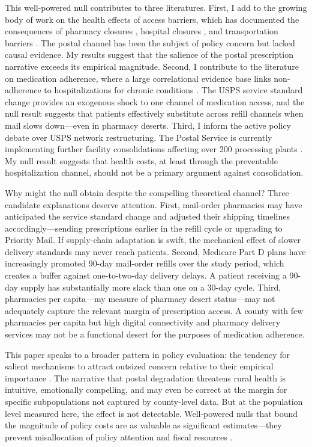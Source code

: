 \documentclass[12pt]{article}
\begin{document}
This well-powered null contributes to three literatures. First, I add to the growing body of work on the health effects of access barriers, which has documented the consequences of pharmacy closures \citep{guadamuz2021pharmacy, evens2023pharmacy}, hospital closures \citep{buchmueller2006flight, gujral2020impact}, and transportation barriers \citep{syed2013traveling}. The postal channel has been the subject of policy concern \citep{brookings2021mail} but lacked causal evidence. My results suggest that the salience of the postal prescription narrative exceeds its empirical magnitude. Second, I contribute to the literature on medication adherence, where a large correlational evidence base links non-adherence to hospitalizations for chronic conditions \citep{ho2009importance, sokol2005adherence}. The USPS service standard change provides an exogenous shock to one channel of medication access, and the null result suggests that patients effectively substitute across refill channels when mail slows down---even in pharmacy deserts. Third, I inform the active policy debate over USPS network restructuring. The Postal Service is currently implementing further facility consolidations affecting over 200 processing plants \citep{usps2023network}. My null result suggests that health costs, at least through the preventable hospitalization channel, should not be a primary argument against consolidation.

Why might the null obtain despite the compelling theoretical channel? Three candidate explanations deserve attention. First, mail-order pharmacies may have anticipated the service standard change and adjusted their shipping timelines accordingly---sending prescriptions earlier in the refill cycle or upgrading to Priority Mail. If supply-chain adaptation is swift, the mechanical effect of slower delivery standards may never reach patients. Second, Medicare Part D plans have increasingly promoted 90-day mail-order refills over the study period, which creates a buffer against one-to-two-day delivery delays. A patient receiving a 90-day supply has substantially more slack than one on a 30-day cycle. Third, pharmacies per capita---my measure of pharmacy desert status---may not adequately capture the relevant margin of prescription access. A county with few pharmacies per capita but high digital connectivity and pharmacy delivery services may not be a functional desert for the purposes of medication adherence.

This paper speaks to a broader pattern in policy evaluation: the tendency for salient mechanisms to attract outsized concern relative to their empirical importance \citep{chandra2011technology}. The narrative that postal degradation threatens rural health is intuitive, emotionally compelling, and may even be correct at the margin for specific subpopulations not captured by county-level data. But at the population level measured here, the effect is not detectable. Well-powered nulls that bound the magnitude of policy costs are as valuable as significant estimates---they prevent misallocation of policy attention and fiscal resources \citep{baicker2013oregon, finkelstein2012oregon}.
\end{document}
